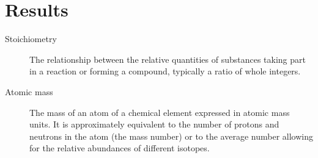 \documentclass{article}
\begin{document}
\section{Results}

\label{definitions}
\begin{description}
\item[Stoichiometry]
The relationship between the relative quantities of substances taking part in a reaction or forming a compound, typically a ratio of whole integers.
\item[Atomic mass]
The mass of an atom of a chemical element expressed in atomic mass units. It is approximately equivalent to the number of protons and neutrons in the atom (the mass number) or to the average number allowing for the relative abundances of different isotopes. 



\end{description}
\end{document}
